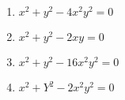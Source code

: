 \documentclass[journal,12pt,twocolumn]{IEEEtran}
\theoremstyle{remark}
\begin{document}
\begin{enumerate}
    \begin{enumerate}
         \item ${x^2+y^2-4x^2y^2}=0$\\
         \item ${x^2+y^2-2xy}=0$\\
         \item ${x^2+y^2-16x^2y^2}=0$\\
         \item ${x^2+Y^2-2x^2y^2}=0$\\
    \end{enumerate}
    

    
    
\end{enumerate}
    
    
    
     
        
                   
    

   
\end{document}
